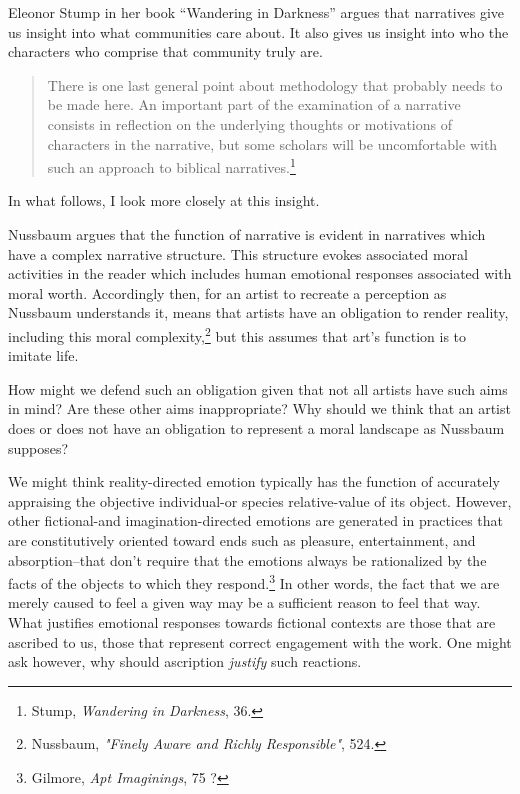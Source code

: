 \documentclass[phdthesis,12pt,final]{wuthesis}
\theoremstyle{definition}
\theoremstyle{definition}
\theoremstyle{definition}
\theoremstyle{definition}
\theoremstyle{remark}
\begin{document}
Eleonor Stump in her book ``Wandering in Darkness'' argues that narratives give us insight into what communities care about. It also gives us insight into who the characters who comprise that community truly are.

\begin{quote}
There is one last general point about methodology that probably needs to be made here. An important part of the examination of a narrative consists in reflection on the underlying thoughts or motivations of characters in the narrative, but some scholars will be uncomfortable with such an approach to biblical narratives.\footnote{Stump, \emph{Wandering in {Darkness}}, 36.}
\end{quote}

\noindent In what follows, I look more closely at this insight.

Nussbaum argues that the function of narrative is evident in narratives which have a complex narrative structure. This structure evokes associated moral activities in the reader which includes human emotional responses associated with moral worth. Accordingly then, for an artist to recreate a perception as Nussbaum understands it, means that artists have an obligation to render reality, including this moral complexity,\footnote{Nussbaum, \emph{"{Finely Aware} and {Richly Responsible}"}, 524.} but this assumes that art's function is to imitate life.

How might we defend such an obligation given that not all artists have such aims in mind? Are these other aims inappropriate? Why should we think that an artist does or does not have an obligation to represent a moral landscape as Nussbaum supposes?

We might think reality-directed emotion typically has the function of accurately appraising the objective individual-or species relative-value of its object. However, other fictional-and imagination-directed emotions are generated in practices that are constitutively oriented toward ends such as pleasure, entertainment, and absorption--that don't require that the emotions always be rationalized by the facts of the objects to which they respond.\footnote{Gilmore, \emph{Apt {Imaginings}}, 75 ?} In other words, the fact that we are merely caused to feel a given way may be a sufficient reason to feel that way. What justifies emotional responses towards fictional contexts are those that are ascribed to us, those that represent correct engagement with the work. One might ask however, why should ascription \emph{justify} such reactions.
\end{document}
